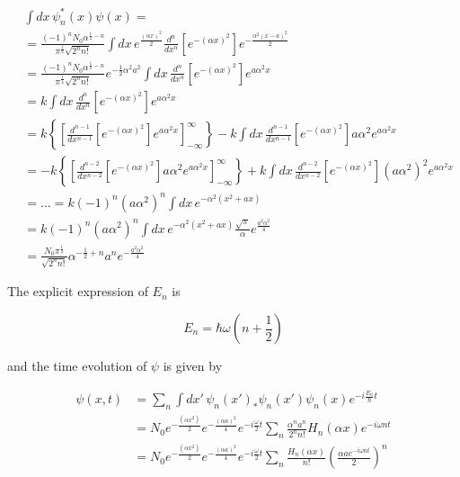 \documentclass{article}
\begin{document}
\begin{align}
& \int dx \, \psi_n^*(x) \psi(x) = \nonumber \\
& = \frac{(-1)^n N_0 \alpha^{\frac{1}{2} - n}}{\pi^{\frac{1}{4}} \sqrt{2^n n!}} \int dx \, e^{\frac{(\alpha x)^2}{2}} \frac{d^n}{dx^n} \left[ e^{-(\alpha x)^2} \right] e^{-\frac{\alpha^2(x-a)^2}{2}} \nonumber \\
& = \frac{(-1)^n N_0 \alpha^{\frac{1}{2} - n}}{\pi^{\frac{1}{4}} \sqrt{2^n n!}} e^{-\frac{1}{2} \alpha^2 a^2} \int dx \, \frac{d^n}{dx^n} \left[ e^{-(\alpha x)^2} \right] e^{a \alpha^2 x} \nonumber \\
& = k \int dx \, \frac{d^n}{dx^n} \left[ e^{-(\alpha x)^2} \right] e^{a \alpha^2 x} \nonumber \\
& = k \left\{ \left[ \frac{d^{n-1}}{dx^{n-1}} \left[ e^{-(\alpha x)^2} \right] e^{a\alpha^2x} \right]_{-\infty}^{\infty} \right\} - k \int dx \, \frac{d^{n-1}}{dx^{n-1}} \left[ e^{-(\alpha x)^2} \right] a \alpha^2 e^{a \alpha^2 x} \nonumber \\
& = - k \left\{ \left[ \frac{d^{n-2}}{dx^{n-2}} \left[ e^{-(\alpha x)^2} \right] a \alpha^2 e^{a\alpha^2x} \right]_{-\infty}^{\infty} \right\} + k \int dx \, \frac{d^{n-2}}{dx^{n-2}} \left[ e^{-(\alpha x)^2} \right] (a \alpha^2)^2 e^{a \alpha^2 x} \nonumber \\
& = \ldots = k (-1)^n (a \alpha^2)^n \int dx \, e^{-\alpha^2 (x^2 + ax)} \nonumber \\
& = k (-1)^n (a \alpha^2)^n \int dx \, e^{-\alpha^2 (x^2 + ax)} \frac{\sqrt{\pi}}{\alpha} e^{\frac{a^2 \alpha^2}{4}} \nonumber \\
& = \frac{N_0 \pi^{\frac{1}{4}}}{\sqrt{2^n n!}} \alpha^{-\frac{1}{2}+n} a^n e^{-\frac{a^2 \alpha^2}{4}}
\end{align}

The explicit expression of \( E_n \) is

\begin{equation}
E_n = \hbar \omega \left( n + \frac{1}{2} \right)
\end{equation}

and the time evolution of \( \psi \) is given by

\begin{align}
\psi(x,t) & = \sum_n \int dx' \, \psi_n(x')_* \psi_n(x') \psi_n(x) e^{-i \frac{E_n}{\hbar}t} \nonumber \\
& = N_0 e^{-\frac{(\alpha x^2)}{2}} e^{-\frac{(\alpha a)^2}{4}} e^{-i \frac{\omega}{2} t} \sum_n \frac{\alpha^n a^n}{2^n n!} H_n(\alpha x) e^{-i \omega n t} \nonumber \\
& = N_0 e^{-\frac{(\alpha x^2)}{2}} e^{-\frac{(\alpha a)^2}{4}} e^{-i \frac{\omega}{2} t} \sum_n \frac{H_n(\alpha x)}{n!} \left( \frac{\alpha a e^{-i \omega n t}}{2} \right)^n
\end{align}
\end{document}
